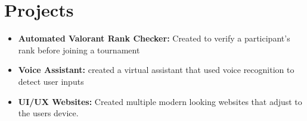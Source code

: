 \documentclass[letterpaper,11pt]{article}
\newcommand{\resumeItem}[1]{
  \item\small{
    {#1 \vspace{-2pt}}
  }
}
\newcommand{\resumeItemListStart}{\begin{itemize}}
\newcommand{\resumeItemListEnd}{\end{itemize}\vspace{-5pt}}
\begin{document}
    

\section{Projects}
    \resumeItemListStart
        \resumeItem{\textbf{Automated Valorant Rank Checker:} Created to verify a participant's rank before joining a tournament}
        \resumeItem{\textbf{Voice Assistant:} created a virtual assistant that used voice recognition to detect user inputs}
        \resumeItem{\textbf{UI/UX Websites:} Created multiple modern looking websites that adjust to the users device. }
      \resumeItemListEnd
    




\end{document}
